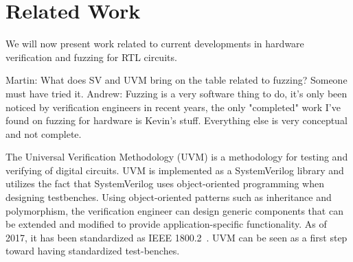 \documentclass[conference]{IEEEtran}
\newcommand{\martin}[1]{{\color{blue} Martin: #1}}
\newcommand{\andrew}[1]{{\color{red} Andrew: #1}}
\newcommand{\rewrite}[1]{{\color{red} rewrite: #1}}
\begin{document}
%
%
%
%
%


\section{Related Work}
\label{sec:related}
We will now present work related to current developments in hardware verification and fuzzing for RTL circuits.

\martin{What does SV and UVM bring on the table related to fuzzing? Someone must have tried it.}
\andrew{Fuzzing is a very software thing to do, it's only been noticed by verification engineers in recent years, the only "completed" work I've found on fuzzing for hardware is Kevin's stuff. Everything else is very conceptual and not complete.}

The Universal Verification Methodology (UVM) is a methodology for testing and verifying of digital circuits.
UVM is implemented as a SystemVerilog library and utilizes the fact that SystemVerilog uses object-oriented programming when designing testbenches.
Using object-oriented patterns such as inheritance and polymorphism, the verification engineer can design generic components that can be extended and modified to provide application-specific functionality.
As of 2017, it has been standardized as IEEE 1800.2~\cite{IEEE:18002}.
UVM can be seen as a first step toward having standardized test-benches.
\end{document}
